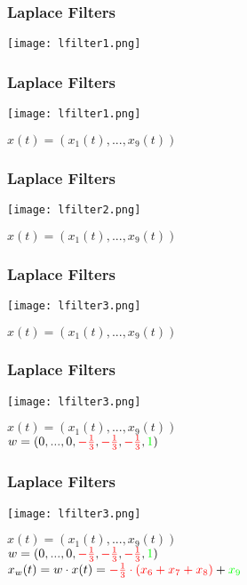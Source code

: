 \documentclass{beamer}
\begin{document}
\begin{frame}
\begin{center}
	\frametitle{Laplace Filters}
	\texttt{[image: lfilter1.png]}
\end{center}
\end{frame}

\begin{frame}
	\begin{center}
	\frametitle{Laplace Filters}
	\texttt{[image: lfilter1.png]}
	\end{center}
	$x(t) = (x_1(t), ..., x_9(t))$ 
\end{frame}

\begin{frame}
	\begin{center}
	\frametitle{Laplace Filters}
	\texttt{[image: lfilter2.png]}
	\end{center}
	$x(t) = (x_1(t), ..., x_9(t))$ 
\end{frame}

\begin{frame}
	\begin{center}
	\frametitle{Laplace Filters}
	\texttt{[image: lfilter3.png]}
	\end{center}
	$x(t) = (x_1(t), ..., x_9(t))$ 
\end{frame}

\begin{frame}
	\begin{center}
	\frametitle{Laplace Filters}
	\texttt{[image: lfilter3.png]}
	\end{center}
	$x(t) = (x_1(t), ..., x_9(t))$ \\
	$w = (0, ..., 0, \textcolor{red}{-\frac{1}{3}}, \textcolor{red}{-\frac{1}{3}}, 
	\textcolor{red}{-\frac{1}{3}}, \textcolor{green}{1})$ 
\end{frame}


\begin{frame}
	\begin{center}
	\frametitle{Laplace Filters}
	\texttt{[image: lfilter3.png]}
	\end{center}
	$x(t) = (x_1(t), ..., x_9(t))$ \\
	$w = (0, ..., 0, \textcolor{red}{-\frac{1}{3}}, \textcolor{red}{-\frac{1}{3}}, 
	\textcolor{red}{-\frac{1}{3}}, \textcolor{green}{1})$ \\
	$x_w(t) = w \cdot x(t) =  \textcolor{red}{-\frac{1}{3} \cdot (x_6 + x_7 + x_8)} + \textcolor{green}{x_9}$
\end{frame}
\end{document}
